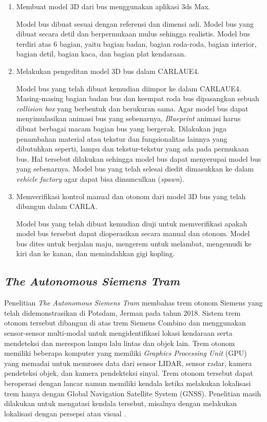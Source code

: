 \begin{enumerate}

    \item Membuat model 3D dari bus menggunakan aplikasi 3ds Max.

    Model bus dibuat sesuai dengan referensi dan dimensi asli. Model bus yang
    dibuat secara detil dan berpermukaan mulus sehingga realistis. Model bus
    terdiri atas 6 bagian, yaitu bagian badan, bagian roda-roda, bagian
    interior, bagian detil, bagian kaca, dan bagian plat kendaraan.

    \item Melakukan pengeditan model 3D bus dalam CARLAUE4.

    Model bus yang telah dibuat kemudian diimpor ke dalam CARLAUE4.
    Masing-masing bagian badan bus dan keempat roda bus dipasangkan sebuah
    \textit{collision box} yang berbentuk dan berukuran sama. Agar model bus
    dapat menyimulasikan animasi bus yang sebenarnya, \textit{Blueprint} animasi
    harus dibuat berbagai macam bagian bus yang bergerak. Dilakukan juga
    penambahan material atau tekstur dan fungsionalitas lainnya yang dibutuhkan
    seperti, lampu dan tekstur-tekstur yang ada pada permukaan bus. Hal tersebut
    dilakukan sehingga model bus dapat menyerupai model bus yang sebenarnya.
    Model bus yang telah selesai diedit dimasukkan ke dalam \textit{vehicle
    factory} agar dapat bisa dimunculkan (\textit{spawn}).

    \item Memverifikasi kontrol manual dan otonom dari model 3D bus yang telah
    dibangun dalam CARLA.

    Model bus yang telah dibuat kemudian diuji untuk memverifikasi apakah model
    bus tersebut dapat dioperasikan secara manual dan otonom. Model bus dites
    untuk berjalan maju, mengerem untuk melambat, mengemudi ke kiri dan ke
    kanan, dan memindahkan gigi kopling.

\end{enumerate}

\subsection{\textit{The Autonomous Siemens Tram}}

Penelitian \textit{The Autonomous Siemens Tram} membahas trem otonom Siemens
yang telah didemonstrasikan di Potsdam, Jerman pada tahun 2018. Sistem trem
otonom tersebut dibangun di atas trem Siemens Combino dan menggunakan
sensor-sensor multi-modal untuk mengidentifikasi lokasi kendaraan serta
mendeteksi dan merespon lampu lalu lintas dan objek lain. Trem otonom memiliki
beberapa komputer yang memiliki \textit{Graphics Processing Unit} (GPU) yang
memadai untuk memroses data dari sensor LIDAR, sensor radar, kamera pendeteksi
objek, dan kamera pendekteksi sinyal. Trem otonom tersebut dapat beroperasi
dengan lancar namun memiliki kendala ketika melakukan lokalisasi trem hanya
dengan Global Navigation Satellite System (GNSS). Penelitian masih dilakukan
untuk mengatasi kendala tersebut, misalnya dengan melakukan lokalisasi dengan
persepsi atau visual \parencite{at-palmer}.
